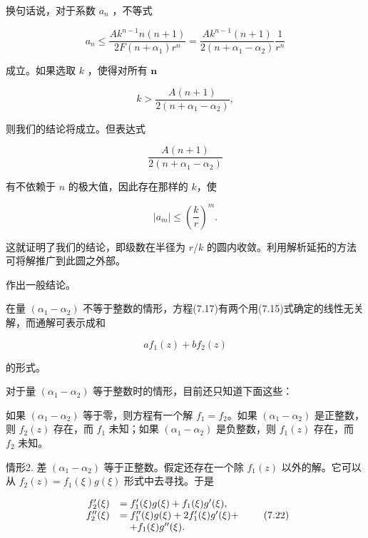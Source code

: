 换句话说，对于系数 $a_{n}$ ，不等式

\begin{equation*}
a _ {n} \leqslant \frac {A k ^ {n - 1} n (n + 1)}{2 F (n + \alpha_ {1}) r ^ {n}} = \frac {A k ^ {n - 1} (n + 1)}{2 (n + \alpha_ {1} - \alpha_ {2})} \frac {1}{r ^ {n}}\tag{7.20}
\end{equation*}

成立。如果选取 $k$ ，使得对所有 $\pmb{n}$

\begin{equation*}
k > \frac {A (n + 1)}{2 \left(n + \alpha_ {1} - \alpha_ {2}\right)},
\end{equation*}

则我们的结论将成立。但表达式

\begin{equation*}
\frac {A (n + 1)}{2 \left(n + \alpha_ {1} - \alpha_ {2}\right)}
\end{equation*}

有不依赖于 $n$ 的极大值，因此存在那样的 $k$，使

\begin{equation*}
\left| a _ {m} \right| \leqslant \left(\frac {k}{r}\right) ^ {m}.\tag{7.21}
\end{equation*}

这就证明了我们的结论，即级数在半径为 $r$/$k$ 的圆内收敛。利用解析延拓的方法可将解推广到此圆之外部。

作出一般结论。

在量 $(\alpha_{1} - \alpha_{2})$ 不等于整数的情形，方程(7.17)有两个用(7.15)式确定的线性无关解，而通解可表示成和

\begin{equation*}
a f _ {1} (z) + b f _ {2} (z)
\end{equation*}

的形式。

对于量 $(\alpha_{1} - \alpha_{2})$ 等于整数时的情形，目前还只知道下面这些：

如果 $(\alpha_{1} - \alpha_{2})$ 等于零，则方程有一个解 $f_{1} = f_{2}$。如果 $(\alpha_{1} - \alpha_{2})$ 是正整数，则 $f_{2}(z)$ 存在，而 $f_{1}$ 未知；如果 $(\alpha_{1} - \alpha_{2})$ 是负整数，则 $f_{1}(z)$ 存在，而 $f_{2}$ 未知。

情形2. 差 $(\alpha_{1} - \alpha_{2})$ 等于正整数。假定还存在一个除 $f_{1}(z)$ 以外的解。它可以从 $f_{2}(z) = f_{1}(\xi)g(\xi)$ 形式中去寻找。于是

\begin{equation*}
\begin{array}{r l} f _ {2} ^ {\prime} (\xi) & = f _ {1} ^ {\prime} (\xi) g (\xi) + f _ {1} (\xi) g ^ {\prime} (\xi), \\ f _ {2} ^ {\prime \prime} (\xi) & = f _ {1} ^ {\prime \prime} (\xi) g (\xi) + 2 f _ {1} ^ {\prime} (\xi) g ^ {\prime} (\xi) + \\ & \quad + f _ {1} (\xi) g ^ {\prime \prime} (\xi). \end{array}\tag{7.22}
\end{equation*}

